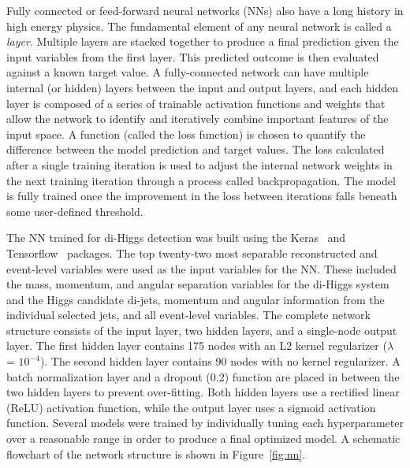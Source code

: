 \label{sec:NN}
Fully connected or feed-forward neural networks (NNs) also have a long history in high energy physics. The fundamental element of any neural network is called a \textit{layer}. Multiple layers are stacked together to produce a final prediction given the input variables from the first layer. This predicted outcome is then evaluated against a known target value. A fully-connected network can have multiple internal (or hidden) layers between the input and output layers, and each hidden layer is composed of a series of trainable activation functions and weights that allow the network to identify and iteratively combine important features of the input space. A function (called the loss function) is chosen to quantify the difference between the model prediction and target values. The loss calculated after a single training iteration is used to adjust the internal network weights in the next training iteration through a process called backpropagation. The model is fully trained once the improvement in the loss between iterations falls beneath some user-defined threshold.

The NN trained for di-Higgs detection was built using the Keras~\cite{chollet2015keras} and Tensorflow~\cite{tensorflow} packages. The top twenty-two most separable reconstructed and event-level variables were used as the input variables for the NN. These included the mass, momentum, and angular separation variables for the di-Higgs system and the Higgs candidate di-jets, momentum and angular information from the individual selected jets, and all event-level variables. The complete network structure consists of the input layer, two hidden layers, and a single-node output layer. The first hidden layer contains 175 nodes with an L2 kernel regularizer ($\lambda$ = $10^{-4}$). The second hidden layer contains 90 nodes with no kernel regularizer. A batch normalization layer and a dropout (0.2) function are placed in between the two hidden layers to prevent over-fitting. Both hidden layers use a rectified linear (ReLU) activation function, while the output layer uses a sigmoid activation function. Several models were trained by individually tuning each hyperparameter over a reasonable range in order to produce a final optimized model. A schematic flowchart of the network structure is shown in Figure~\ref{fig:nn}.

